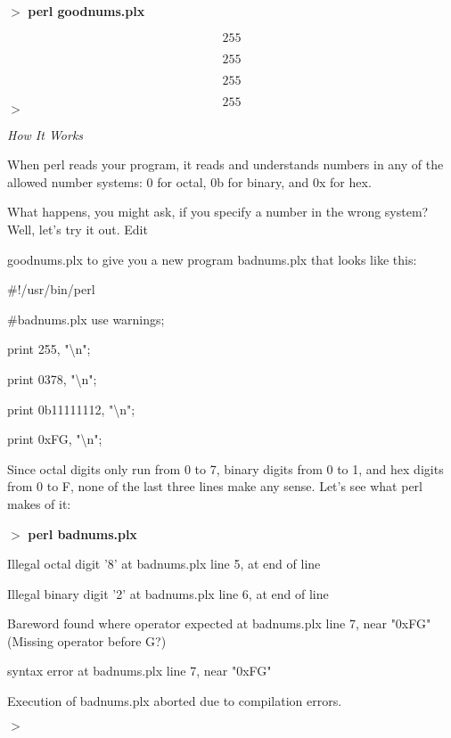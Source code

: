\documentclass[a4paper,11pt]{book}
\begin{document}
\noindent 

\noindent $>$ \textbf{perl goodnums.plx}

\[255\] 

\[255\] 

\[255\] 

\[255\] 
$>$

\noindent 

\noindent \textit{How It Works}

\noindent When perl reads your program, it reads and understands numbers in any of the allowed number systems: 0 for octal, 0b for binary, and 0x for hex.

\noindent 

\noindent What happens, you might ask, if you specify a number in the wrong system? Well, let's try it out. Edit

\noindent goodnums.plx to give you a new program badnums.plx that looks like this:

\noindent 

\noindent 

\noindent \#!/usr/bin/perl

\noindent \#badnums.plx use warnings;

\noindent print 255, "\textbackslash n";

\noindent print 0378, "\textbackslash n";

\noindent print 0b11111112, "\textbackslash n";

\noindent print 0xFG, "\textbackslash n";

\noindent 

\noindent Since octal digits only run from 0 to 7, binary digits from 0 to 1, and hex digits from 0 to F, none of the last three lines make any sense. Let's see what perl makes of it:

\noindent 

\noindent $>$ \textbf{perl badnums.plx}

\noindent Illegal octal digit '8' at badnums.plx line 5, at end of line

\noindent Illegal binary digit '2' at badnums.plx line 6, at end of line

\noindent Bareword found where operator expected at badnums.plx line 7, near "0xFG" (Missing operator before G?)

\noindent syntax error at badnums.plx line 7, near "0xFG"

\noindent Execution of badnums.plx aborted due to compilation errors.

\noindent $>$
\end{document}

